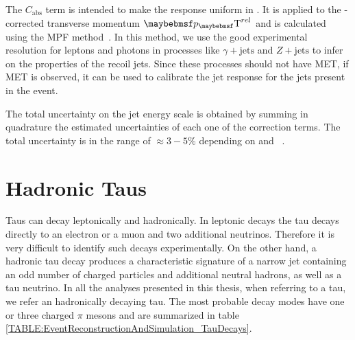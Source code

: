 The $C_{\text{abs}}$ term is intended to make the response uniform in \pt. It is applied to the \eta-corrected transverse momentum $\pT^{rel}$ and is calculated using the \gls{MPF} method~\cite{ARTICLE:CDFDijetAngularDistribution}. In this method, we use the good experimental resolution for leptons and photons in processes like $\gamma + \text{jets}$ and $Z + \text{jets}$ to infer on the properties of the recoil jets. Since these processes should not have \gls{MET}, if MET is observed, it can be used to calibrate the jet response for the jets present in the event.

The total uncertainty on the jet energy scale is obtained by summing in quadrature the estimated uncertainties of each one of the correction terms. The total uncertainty is in the range of $\approx 3-5\%$ depending on \pt and \eta~\cite{ARTICLE:CMSDeterminationJetEnergyCalibration}.


\section{Hadronic Taus}
\label{SECTION:EventReconstructionAndSimulation_Taus}


Taus can decay leptonically and hadronically. In leptonic decays the tau decays directly to an electron or a muon and two additional neutrinos. Therefore it is very difficult to identify such decays experimentally. On the other hand, a hadronic tau decay produces a characteristic signature of a narrow jet containing an odd number of charged particles and additional neutral hadrons, as well as a tau neutrino. In all the analyses presented in this thesis, when referring to a tau, we refer an hadronically decaying tau. The most probable decay modes have one or three charged $\pi$ mesons and are summarized in table \ref{TABLE:EventReconstructionAndSimulation_TauDecays}. 

